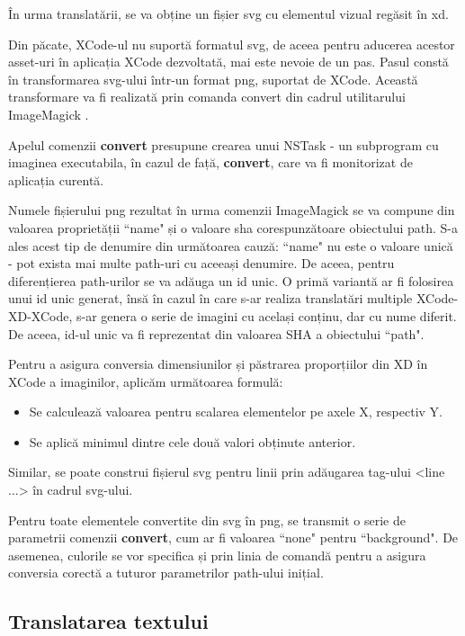 În urma translatării, se va obține un fișier svg cu elementul vizual regăsit în xd. 

Din păcate, XCode-ul nu suportă formatul svg, de aceea pentru aducerea acestor asset-uri în aplicația XCode dezvoltată, mai este nevoie de un pas. Pasul constă în transformarea svg-ului într-un format png, suportat de XCode. Această transformare va fi realizată prin comanda convert din cadrul utilitarului ImageMagick \cite{imageMagick}. 

Apelul comenzii \textbf{convert} presupune crearea unui NSTask - un subprogram cu imaginea executabila, în cazul de față, \textbf{convert}, care va fi monitorizat de aplicația curentă. 

Numele fișierului png rezultat în urma comenzii ImageMagick se va compune din valoarea proprietății ``name" și o valoare sha corespunzătoare obiectului path. S-a ales acest tip de denumire din următoarea cauză: ``name" nu este o valoare unică - pot exista mai multe path-uri cu aceeași denumire. De aceea, pentru diferențierea path-urilor se va adăuga un id unic. O primă variantă ar fi folosirea unui id unic generat, însă în cazul în care s-ar realiza translatări multiple XCode-XD-XCode, s-ar genera o serie de imagini cu același conținu, dar cu nume diferit. De aceea, id-ul unic va fi reprezentat din valoarea SHA a obiectului ``path".

Pentru a asigura conversia dimensiunilor și păstrarea proporțiilor din XD în XCode a imaginilor, aplicăm următoarea formulă:

\begin{itemize}  
\item Se calculează valoarea pentru scalarea elementelor pe axele X, respectiv Y.
\item Se aplică minimul dintre cele două valori obținute anterior.
\end{itemize}

Similar, se poate construi fișierul svg pentru linii prin adăugarea tag-ului <line ...> în cadrul svg-ului.

Pentru toate elementele convertite din svg în png, se transmit o serie de parametrii comenzii \textbf{convert}, cum ar fi valoarea ``none" pentru ``background". De asemenea, culorile se vor specifica și prin linia de comandă pentru a asigura conversia corectă a tuturor parametrilor path-ului inițial.

\subsection{Translatarea textului}

